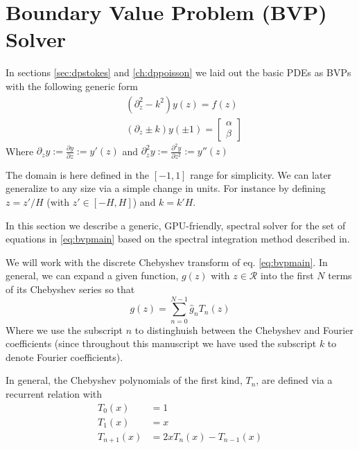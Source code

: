 \documentclass[ twoside,openright,titlepage,numbers=noenddot,%
headinclude,footinclude,cleardoublepage=empty,abstract=on,
BCOR=5mm,paper=a4,fontsize=11pt, dvipsnames
]{scrreprt}
\newcommand{\gpu}{\gls{GPU}\xspace}
\newcommand{\fou}[1]{\widehat{#1}}
\begin{document}
\chapter{Boundary Value Problem (BVP) Solver} \label{sec:bvp}
In sections \ref{sec:dpstokes} and \ref{ch:dppoisson} we laid out the basic \glspl{PDE} as \glspl{BVP} with the following generic form
\begin{equation}
  \label{eq:bvpmain}
  \begin{aligned}
    &(\partial^2_{z}-k^2)y(z)=f(z)\\
    &(\partial_{z}\pm k)y(\pm 1)=
    \begin{bmatrix}
      \alpha\\
      \beta
    \end{bmatrix}
\end{aligned}
\end{equation}
Where $\partial_z y:= \frac{\partial y}{\partial z} := y'(z)$ and $\partial^2_{z} y:= \frac{\partial^2 y}{\partial z^2} := y''(z)$

The domain is here defined in the $[-1, 1]$ range for simplicity. We can later generalize to any size via a simple change in units. For instance by defining $z = z'/H$ (with $z'\in [-H, H]$) and $k = k'H$.

In this section we describe a generic, \gpu-friendly, spectral solver for the set of equations in \eqref{eq:bvpmain} based on the spectral integration method described in\cite{Greengard1991}.

We will work with the discrete Chebyshev transform of eq. \eqref{eq:bvpmain}. In general, we can expand a given function, $g(z)$ with $z\in \mathcal{R}$ into the first $N$ terms of its Chebyshev series so that
\begin{equation}
\label{eq:bvpchebexp}
g(z) = \sum_{n=0}^{N-1} \fou{g}_n T_n(z)
\end{equation}
Where we use the subscript $n$ to distinghuish between the Chebyshev and Fourier coefficients (since throughout this manuscript we have used the subscript $k$ to denote Fourier coefficients).

In general, the Chebyshev polynomials of the first kind, $T_n$, are defined via a recurrent relation with
\begin{equation}
  \label{eq:bvpchebpoly}
  \begin{aligned}
    T_0(x) &= 1\\
    T_1(x) &= x\\
    T_{n+1}(x) &= 2xT_n(x) - T_{n-1}(x)
  \end{aligned}
\end{equation}
\end{document}
